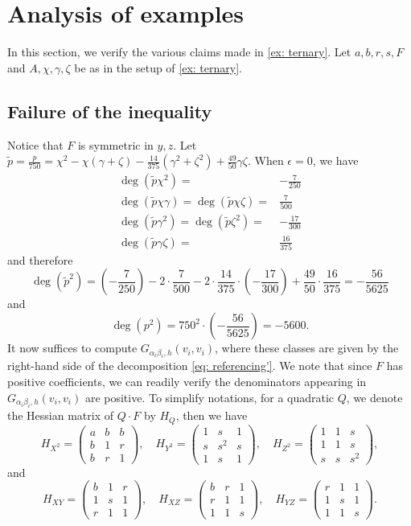 \section{Analysis of examples}\label{sec: ex} 
In this section, we verify the various claims made in \cref{ex: ternary}. Let $a,b,r,s, F$ and $A, \chi,\gamma,\zeta$ be as in the setup of \cref{ex: ternary}.
\subsection{Failure of the inequality} Notice that $F$ is symmetric in $y,z$. Let $\tilde{p}=\frac{p}{750}=\chi^2-\chi(\gamma+\zeta)-\frac{14}{375}(\gamma^2+\zeta^2)+\frac{49}{50}\gamma\zeta$. When $\epsilon=0$, we have
\begin{align*}
    \deg(\tilde p \chi^2)=&-\frac{7}{250}\\
    \deg(\tilde p \chi\gamma)=\deg(\tilde p\chi\zeta)=&\frac{7}{500}\\
    \deg(\tilde p \gamma^2)=\deg(\tilde p \zeta^2)=&-\frac{17}{300}\\
    \deg(\tilde p \gamma\zeta)=&
\frac{16}{375}\end{align*}
and therefore
\[
    \deg(\tilde p^2)=(-\frac{7}{250})-2\cdot \frac{7}{500}-2\cdot\frac{14}{375}\cdot(-\frac{17}{300})+\frac{49}{50}\cdot \frac{16}{375}=-\frac{56}{5625}
\]
and
\[
    \deg(p^2)=750^2\cdot(-\frac{56}{5625})=-5600.
\]
It now suffices to compute $G_{\alpha_i\beta_i,h}(v_i,v_i)$, where these classes are given by the right-hand side of the decomposition \eqref{eq: referencing'}. We note that since $F$ has positive coefficients, we can readily verify the denominators appearing in $G_{\alpha_i\beta_i,h}(v_i,v_i)$ are positive. To simplify notations,  for a quadratic $Q$, we denote the Hessian matrix of $Q\cdot F$ by $H_Q$, then we have
\[
H_{X^2}=
\begin{pmatrix}
a&b&b\\
b&1&r\\
b&r&1
\end{pmatrix},\quad
H_{Y^2}=
\begin{pmatrix}
1&s&1\\
s&s^2&s\\
1&s&1
\end{pmatrix},\quad
H_{Z^2}=
\begin{pmatrix}
1&1&s\\
1&1&s\\
s&s&s^2
\end{pmatrix},
\]
and
\[
H_{XY}=
\begin{pmatrix}
b&1&r\\
1&s&1\\
r&1&1
\end{pmatrix},\quad
H_{XZ}=
\begin{pmatrix}
b&r&1\\
r&1&1\\
1&1&s
\end{pmatrix},\quad
H_{YZ}=
\begin{pmatrix}
r&1&1\\
1&s&1\\
1&1&s
\end{pmatrix}.
\]
